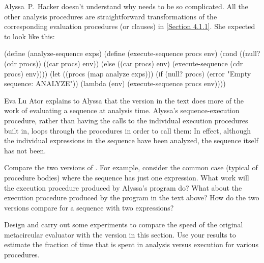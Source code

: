 \begin{exercise}
	\label{Exercise 4.23}
	Alyssa~P.~Hacker doesn’t understand why  needs to be so complicated.
	All the other analysis procedures are straightforward transformations of the corresponding evaluation procedures (or  clauses) in \cref{Section 4.1.1}.
	She expected  to look like this:
	\begin{scheme}
	  (define (analyze-sequence exps)
	    (define (execute-sequence procs env)
	      (cond ((null? (cdr procs))
	             ((car procs) env))
	            (else
	             ((car procs) env)
	             (execute-sequence (cdr procs) env))))
	    (let ((procs (map analyze exps)))
	      (if (null? procs)
	          (error "Empty sequence: ANALYZE"))
	      (lambda (env)
	        (execute-sequence procs env))))
	\end{scheme}
	Eva Lu Ator explains to Alyssa that the version in the text does more of the work of evaluating a sequence at analysis time.
	Alyssa’s sequence-execution procedure, rather than having the calls to the individual execution procedures built in, loops through the procedures in order to call them:
	In effect, although the individual expressions in the sequence have been analyzed, the sequence itself has not been.

	Compare the two versions of .
	For example, consider the common case (typical of procedure bodies) where the sequence has just one expression.
	What work will the execution procedure produced by Alyssa’s program do?
	What about the execution procedure produced by the program in the text above?
	How do the two versions compare for a sequence with two expressions?
\end{exercise}



\begin{exercise}
	\label{Exercise 4.24}
	Design and carry out some  experiments to compare the speed of the original metacircular evaluator with the version in this section.
	Use your results to estimate the fraction of time that is spent in analysis versus execution for various procedures.
\end{exercise}
